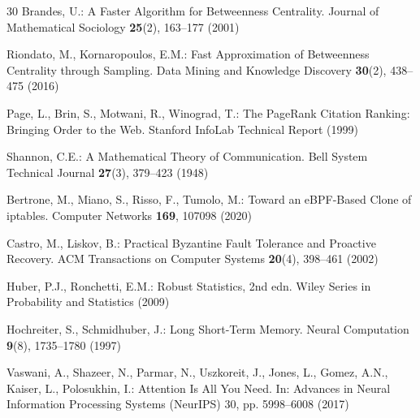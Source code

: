 \documentclass[runningheads]{llncs}
\begin{document}
\begin{thebibliography}{30}
 Brandes, U.: A Faster Algorithm for Betweenness Centrality. Journal of Mathematical Sociology \textbf{25}(2), 163--177 (2001)

 Riondato, M., Kornaropoulos, E.M.: Fast Approximation of Betweenness Centrality through Sampling. Data Mining and Knowledge Discovery \textbf{30}(2), 438--475 (2016)

 Page, L., Brin, S., Motwani, R., Winograd, T.: The PageRank Citation Ranking: Bringing Order to the Web. Stanford InfoLab Technical Report (1999)

 Shannon, C.E.: A Mathematical Theory of Communication. Bell System Technical Journal \textbf{27}(3), 379--423 (1948)

 Bertrone, M., Miano, S., Risso, F., Tumolo, M.: Toward an eBPF-Based Clone of iptables. Computer Networks \textbf{169}, 107098 (2020)

 Castro, M., Liskov, B.: Practical Byzantine Fault Tolerance and Proactive Recovery. ACM Transactions on Computer Systems \textbf{20}(4), 398--461 (2002)

 Huber, P.J., Ronchetti, E.M.: Robust Statistics, 2nd edn. Wiley Series in Probability and Statistics (2009)

 Hochreiter, S., Schmidhuber, J.: Long Short-Term Memory. Neural Computation \textbf{9}(8), 1735--1780 (1997)

 Vaswani, A., Shazeer, N., Parmar, N., Uszkoreit, J., Jones, L., Gomez, A.N., Kaiser, L., Polosukhin, I.: Attention Is All You Need. In: Advances in Neural Information Processing Systems (NeurIPS) 30, pp. 5998--6008 (2017)

\end{thebibliography}
\end{document}
